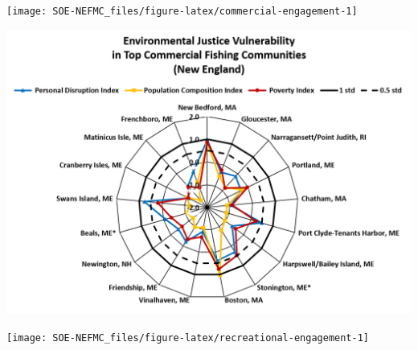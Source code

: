 \documentclass[
  10pt,
]{article}
\let\origfigure\figure
\let\endorigfigure\endfigure
\renewenvironment{figure}[1][2] {
    \expandafter\origfigure\expandafter[H]
} {
    \endorigfigure
}
\begin{document}
\begin{figure}

{\centering \texttt{[image: SOE-NEFMC\_files/figure-latex/commercial-engagement-1]} 

}

\caption{Commercial engagement, reliance, and environmental justice vulnerability for the top commercially engaged and reliant fishing communities in New England. Communities in orange are ranked medium-high or above for one or more of the environmental justice indicators Communities in purple are ranked medium for one or more of the environmental justice indicators. *Community scored high (1.00 and above) for both commercial engagement and reliance indicators.}\label{fig:commercial-engagement}
\end{figure}
\begin{figure}

{\centering \includegraphics[width=0.7\linewidth]{SOE-NEFMC_files/figure-latex/commercial-EJ-1} 

}

\caption{Environmental justice indicators (Poverty Index, population composition index, and personal disruption index) for top commercial fishing communities in New England. *Community scored high (1.00 and above) for both commercial engagement and reliance indicators.}\label{fig:commercial-EJ}
\end{figure}
\begin{figure}

{\centering \texttt{[image: SOE-NEFMC\_files/figure-latex/recreational-engagement-1]} 

}

\caption{Recreational engagement and reliance, and environmental justice vulnerability, for the top recreationally engaged and reliant fishing communities in New England. None of these communities ranked medium-high or above for one or more of the environmental justice indicators. Communities ranked medium for one or more of the environmental justice indicators are highlighted in purple. *Community scored high (1.00 and above) for both recreational engagement and reliance indicators.}\label{fig:recreational-engagement}
\end{figure}
\end{document}
